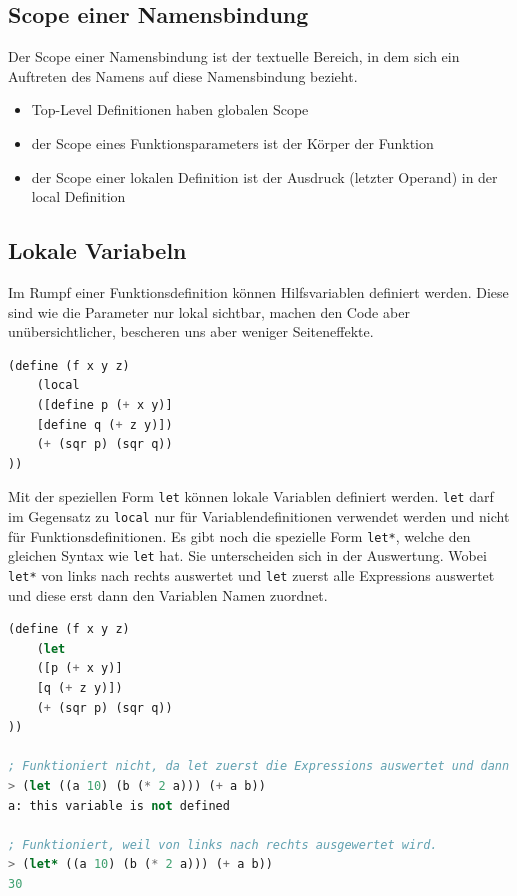 \subsection{Scope einer Namensbindung}
Der Scope einer Namensbindung ist der textuelle Bereich, in dem sich ein Auftreten des Namens auf diese Namensbindung bezieht.
\begin{itemize}
	\item Top-Level Definitionen haben globalen Scope
	\item der Scope eines Funktionsparameters ist der Körper der Funktion
	\item der Scope einer lokalen Definition ist der Ausdruck (letzter Operand) in der local Definition
\end{itemize}

\subsection{Lokale Variabeln}
Im Rumpf einer Funktionsdefinition können Hilfsvariablen definiert werden. Diese sind wie die Parameter nur lokal sichtbar, machen den Code aber unübersichtlicher, bescheren uns aber weniger Seiteneffekte.

\begin{lstlisting}[language=Lisp, caption=Lokale Variablen mit local]
(define (f x y z)
	(local
	([define p (+ x y)]
	[define q (+ z y)])
	(+ (sqr p) (sqr q))
))
\end{lstlisting}

Mit der speziellen Form \verb|let| können lokale Variablen definiert werden. \verb|let| darf im Gegensatz zu \verb|local| nur für Variablendefinitionen verwendet werden und nicht für Funktionsdefinitionen. Es gibt noch die spezielle Form \verb|let*|, welche den gleichen Syntax wie \verb|let| hat. Sie unterscheiden sich in der Auswertung. Wobei \verb|let*| von links nach rechts auswertet und \verb|let| zuerst alle Expressions auswertet und diese erst dann den Variablen Namen zuordnet.

\begin{lstlisting}[language=Lisp, caption=Lokale Variablen mit let]
(define (f x y z)
	(let
	([p (+ x y)]
	[q (+ z y)])
	(+ (sqr p) (sqr q))
))

; Funktioniert nicht, da let zuerst die Expressions auswertet und dann erst die Zuweisung macht. Die Variable a muss vorgängig definiert werden.
> (let ((a 10) (b (* 2 a))) (+ a b))
a: this variable is not defined

; Funktioniert, weil von links nach rechts ausgewertet wird.
> (let* ((a 10) (b (* 2 a))) (+ a b))
30
\end{lstlisting}

